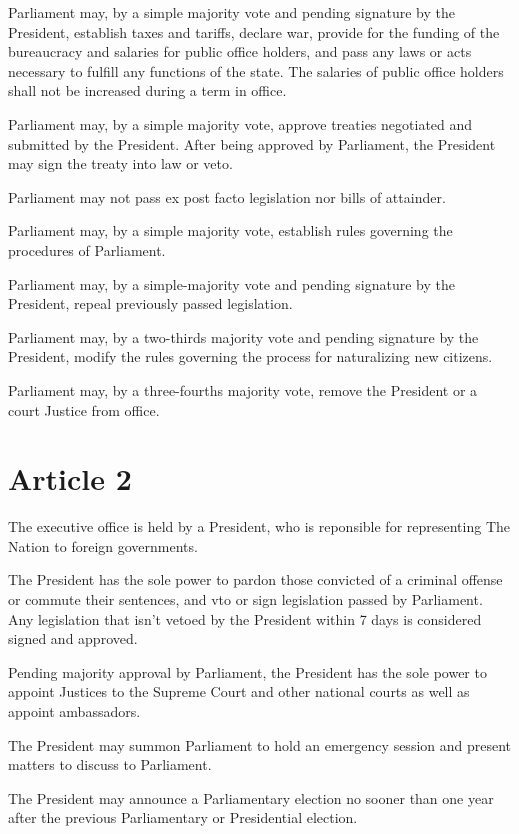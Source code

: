 \documentclass{report}
\newcommand{\nation}{The Nation}
\begin{document}
    Parliament may, by a simple majority vote and pending signature by the
    President, establish taxes and tariffs, declare war, provide for the
    funding of the bureaucracy and salaries for public office holders, and pass
    any laws or acts necessary to fulfill any functions of the state. The
    salaries of public office holders shall not be increased during a term in
    office.

    Parliament may, by a simple majority vote, approve treaties negotiated and
    submitted by the President. After being approved by Parliament, the
    President may sign the treaty into law or veto.

    Parliament may not pass ex post facto legislation nor bills of attainder.

    Parliament may, by a simple majority vote, establish rules governing the
    procedures of Parliament.

    Parliament may, by a simple-majority vote and pending signature by the
    President, repeal previously passed legislation.

    Parliament may, by a two-thirds majority vote and pending signature by
    the President, modify the rules governing the process for naturalizing new
    citizens.

    Parliament may, by a three-fourths majority vote, remove the President or a
    court Justice from office.

    \section{Article 2}

    The executive office is held by a President, who is reponsible for
    representing \nation{} to foreign governments.

    The President has the sole power to pardon those convicted of a criminal
    offense or commute their sentences, and vto or sign legislation passed by
    Parliament. Any legislation that isn't vetoed by the President within 7 days
    is considered signed and approved.

    Pending majority approval by Parliament, the President has the sole power
    to appoint Justices to the Supreme Court and other national courts as well
    as appoint ambassadors.

    The President may summon Parliament to hold an emergency session and present
    matters to discuss to Parliament.

    The President may announce a Parliamentary election no sooner than one year
    after the previous Parliamentary or Presidential election.
\end{document}
